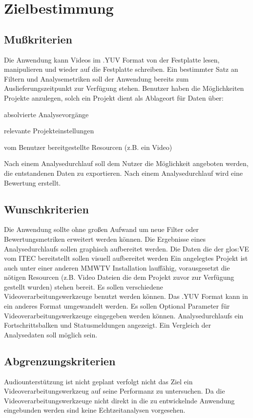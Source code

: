 \chapter{Zielbestimmung}

\section{Mußkriterien}
\setcounter{counterKriterien}{0}
 
 Die Anwendung kann Videos im .YUV Format von der Festplatte lesen, manipulieren und wieder auf die Festplatte schreiben.
 Ein bestimmter Satz an Filtern und Analysemetriken soll der Anwendung bereits zum Auslieferungszeitpunkt zur Verfügung stehen.
 Benutzer haben die Möglichkeiten Projekte anzulegen, solch ein Projekt dient als Ablageort für Daten über:
\begin{compactitem}
\item absolvierte Analysevorgänge
\item relevante Projekteinstellungen
\item vom Benutzer bereitgestellte Resourcen (z.B. ein Video)
\end{compactitem}
 Nach einem Analysedurchlauf soll dem Nutzer die Möglichkeit angeboten werden, die entstandenen Daten zu exportieren.
 Nach einem Analysedurchlauf wird eine Bewertung erstellt.

\section{Wunschkriterien}
\setcounter{counterKriterien}{0}
 Die Anwendung sollte ohne großen Aufwand um neue Filter oder Bewertungsmetriken erweitert werden können.
 Die Ergebnisse eines Analysedurchlaufs sollen graphisch aufbereitet werden.
 Die Daten die der \gls{glos:VE} vom \gls{ITEC}  bereitstellt sollen visuell aufbereitet werden
 Ein angelegtes Projekt ist auch unter einer anderen MMWTV Installation lauffähig, vorausgesetzt die nötigen Resourcen (z.B. Video Dateien die dem Projekt zuvor zur Verfügung gestellt wurden) stehen bereit.
 Es sollen verschiedene Videoverarbeitungswerkzeuge benutzt werden können.
 Das .YUV Format kann in ein anderes Format umgewandelt werden.
 Es sollen Optional Parameter für Videoverarbeitungswerkzeuge eingegeben werden können.
 Analysedurchlaufs ein Fortschrittsbalken und Statusmeldungen angezeigt.
 Ein Vergleich der Analysedaten soll möglich sein.

\section{Abgrenzungskriterien}
\setcounter{counterKriterien}{0}
 Audiounterstützung ist nicht geplant
 \projektTitel verfolgt nicht das Ziel ein Videoverarbeitungswerkzeug auf seine Performanz zu untersuchen.
 Da die Videoverarbeitungswerkzeuge nicht direkt in die zu entwickelnde Anwendung eingebunden werden sind keine Echtzeitanalysen vorgesehen.

